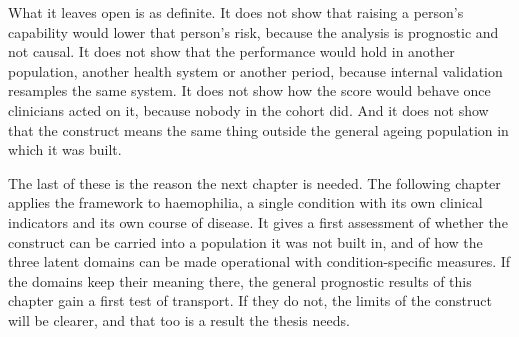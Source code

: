 What it leaves open is as definite. It does not show that raising a person's capability would lower that person's risk, because the analysis is prognostic and not causal. It does not show that the performance would hold in another population, another health system or another period, because internal validation resamples the same system. It does not show how the score would behave once clinicians acted on it, because nobody in the cohort did. And it does not show that the construct means the same thing outside the general ageing population in which it was built.

The last of these is the reason the next chapter is needed. The following chapter applies the framework to haemophilia, a single condition with its own clinical indicators and its own course of disease. It gives a first assessment of whether the construct can be carried into a population it was not built in, and of how the three latent domains can be made operational with condition-specific measures. If the domains keep their meaning there, the general prognostic results of this chapter gain a first test of transport. If they do not, the limits of the construct will be clearer, and that too is a result the thesis needs.
